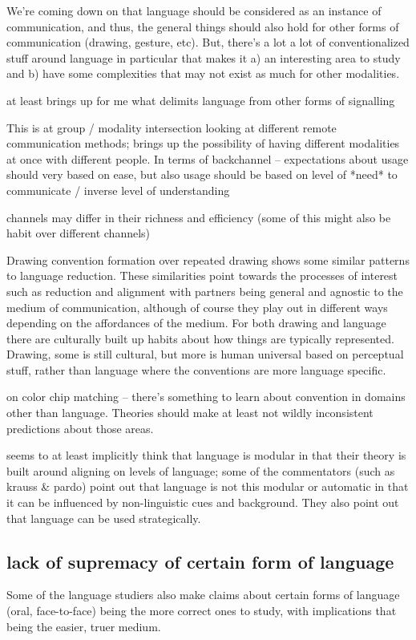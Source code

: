 \documentclass[]{article}
\begin{document}
We're coming down on that language should be considered as an instance of communication, and thus, the general things should also hold for other forms of communication (drawing, gesture, etc). But, there's a lot a lot of conventionalized stuff around language in particular that makes it a) an interesting area to study and b) have some complexities that may not exist as much for other modalities. 

\cite{clark1996} at least brings up for me what delimits language from other forms of signalling

This is at group / modality intersection \cite{foxtree2013} looking at different remote communication methods; brings up the possibility of having different modalities at once with different people. In terms of backchannel -- expectations about usage should very based on ease, but also usage should be based on level of *need* to communicate / inverse level of understanding 

channels may differ in their richness and efficiency (some of this might also be habit over different channels)

\cite{hawkinsa} Drawing convention formation over repeated drawing shows some similar patterns to language reduction. These similarities point towards the processes of interest such as reduction and alignment with partners being general and agnostic to the medium of communication, although of course they play out in different ways depending on the affordances of the medium. For both drawing and language there are culturally built up habits about how things are typically represented. Drawing, some is still cultural, but more is human universal based on perceptual stuff, rather than language where the conventions are more language specific. 

\cite{murthy2022} on color chip matching -- there's something to learn about convention in domains other than language. Theories should make at least not wildly inconsistent predictions about those areas. 

\cite{pickering2004} seems to at least implicitly think that language is modular in that their theory is built around aligning on levels of language; some of the commentators (such as krauss \& pardo) point out that language is not this modular or automatic in that it can be influenced by non-linguistic cues and background. They also point out that language can be used strategically. 

\subsection{lack of supremacy of certain form of language}
Some of the language studiers also make claims about certain forms of language (oral, face-to-face) being the more correct ones to study, with implications that being the easier, truer medium. 
\end{document}
